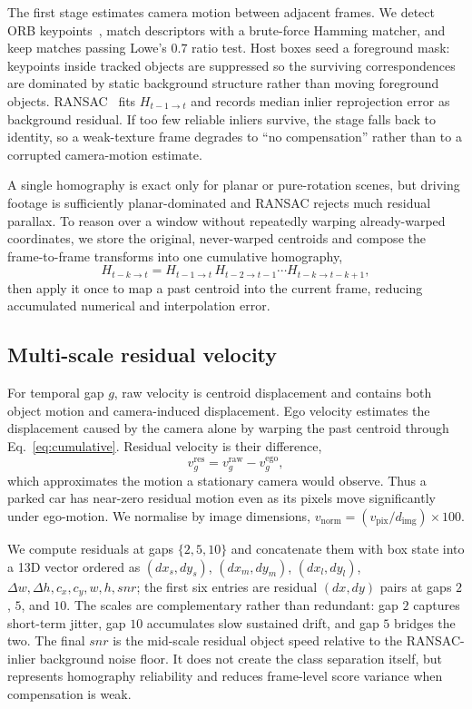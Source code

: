 \documentclass[sigconf,review,anonymous]{acmart}
\begin{document}
The first stage estimates camera motion between adjacent frames. We detect ORB keypoints~\cite{orb}, match descriptors with a brute-force Hamming matcher, and keep matches passing Lowe's $0.7$ ratio test. Host boxes seed a foreground mask: keypoints inside tracked objects are suppressed so the surviving correspondences are dominated by static background structure rather than moving foreground objects. RANSAC~\cite{ransac} fits $H_{t-1\to t}$ and records median inlier reprojection error as background residual. If too few reliable inliers survive, the stage falls back to identity, so a weak-texture frame degrades to ``no compensation'' rather than to a corrupted camera-motion estimate.

A single homography is exact only for planar or pure-rotation scenes, but driving footage is sufficiently planar-dominated and RANSAC rejects much residual parallax. To reason over a window without repeatedly warping already-warped coordinates, we store the original, never-warped centroids and compose the frame-to-frame transforms into one cumulative homography,
\begin{equation}
H_{t-k\to t} = H_{t-1\to t}\, H_{t-2\to t-1} \cdots H_{t-k\to t-k+1},
\label{eq:cumulative}
\end{equation}
then apply it once to map a past centroid into the current frame, reducing accumulated numerical and interpolation error.

\subsection{Multi-scale residual velocity}
\label{sec:residual}

For temporal gap $g$, raw velocity is centroid displacement and contains both object motion and camera-induced displacement. Ego velocity estimates the displacement caused by the camera alone by warping the past centroid through Eq.~\ref{eq:cumulative}. Residual velocity is their difference,
\begin{equation}
v^{\mathrm{res}}_{g} = v^{\mathrm{raw}}_{g} - v^{\mathrm{ego}}_{g},
\label{eq:residual}
\end{equation}
which approximates the motion a stationary camera would observe. Thus a parked car has near-zero residual motion even as its pixels move significantly under ego-motion. We normalise by image dimensions, $v_{\mathrm{norm}} = (v_{\mathrm{pix}}/d_{\mathrm{img}})\times 100$.

We compute residuals at gaps $\{2,5,10\}$ and concatenate them with box state into a 13D vector ordered as $(\mathit{dx}_s,\mathit{dy}_s)$, $(\mathit{dx}_m,\mathit{dy}_m)$, $(\mathit{dx}_l,\mathit{dy}_l)$, $\Delta w,\Delta h,c_x,c_y,w,h,\mathit{snr}$; the first six entries are residual $(dx,dy)$ pairs at gaps $2$, $5$, and $10$. The scales are complementary rather than redundant: gap $2$ captures short-term jitter, gap $10$ accumulates slow sustained drift, and gap $5$ bridges the two. The final $\mathit{snr}$ is the mid-scale residual object speed relative to the RANSAC-inlier background noise floor. It does not create the class separation itself, but represents homography reliability and reduces frame-level score variance when compensation is weak.
\end{document}
